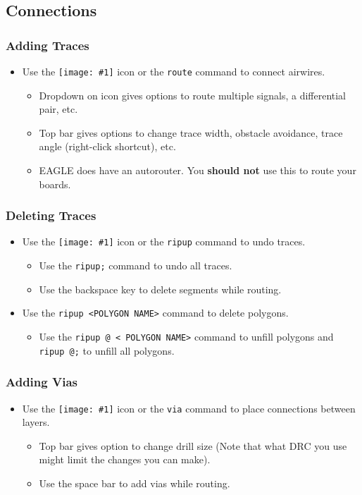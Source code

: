 \documentclass{article}
\newcommand{\icon}[1]{\texttt{[image: \#1]}}
\begin{document}
\subsection{Connections}
\subsubsection{Adding Traces}
\begin{itemize}
    \item Use the \icon{route.png} icon or the \texttt{route} command to connect airwires. 
    \begin{itemize}
        \item Dropdown on icon gives options to route multiple signals, a differential pair, etc. 
        \item Top bar gives options to change trace width, obstacle avoidance, trace angle (right-click shortcut), etc. 
        \item EAGLE does have an autorouter. You \textbf{should not} use this to route your boards. 
    \end{itemize}
\end{itemize}
\subsubsection{Deleting Traces}
\begin{itemize}
    \item Use the \icon{ripup.png} icon or the \texttt{ripup} command to undo traces.
    \begin{itemize}
        \item Use the \texttt{ripup;} command to undo all traces.
        \item Use the backspace key to delete segments while routing.
    \end{itemize}
    \item Use the \texttt{ripup <POLYGON NAME>} command to delete polygons.
    \begin{itemize}
        \item Use the \texttt{ripup @ < POLYGON NAME>} command to unfill polygons and \texttt{ripup @;} to unfill all polygons.
    \end{itemize}
\end{itemize}
\subsubsection{Adding Vias}
\begin{itemize}
    \item Use the \icon{via.png} icon or the \texttt{via} command to place connections between layers.
    \begin{itemize}
        \item Top bar gives option to change drill size (Note that what DRC you use might limit the changes you can make).
        \item Use the space bar to add vias while routing.
    \end{itemize}
\end{itemize}
\end{document}
